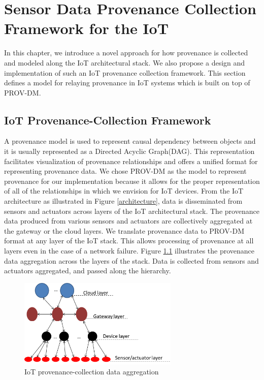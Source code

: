 
\chapter{Sensor Data Provenance Collection Framework for the IoT}

In this chapter, we introduce a novel approach for how provenance is collected and modeled along the IoT architectural stack. We also propose a design and  implementation of such an IoT provenance collection framework. This section defines a model for relaying provenance in IoT systems which is built on top of PROV-DM. 

\section{IoT Provenance-Collection Framework }
%

A provenance model is used to represent causal dependency between objects and it is usually represented as a Directed Acyclic Graph(DAG). This representation facilitates visualization of provenance relationships and offers a unified format for representing provenance data. We chose PROV-DM as the model to represent provenance for our implementation because it allows for the proper representation of all of the relationships in which we envision for IoT devices. 
From the IoT architecture as illustrated in Figure \ref{architecture}, data is disseminated from sensors and actuators across layers of the IoT architectural stack. The provenance data produced from various sensors and actuators are collectively aggregated at the gateway or the cloud layers. We translate provenance data to PROV-DM format at any layer of the IoT stack. This allows processing of provenance at all layers even in the case of a network failure. 
 Figure \ref{aggregation} illustrates the provenance data aggregation across the layers of the stack. Data is collected from sensors and actuators aggregated, and passed along the hierarchy. 


\begin{figure}[h!]
\begin{center}

\includegraphics[width=3.0in]{iot_aggregation.PNG}    
\end{center}
\caption{IoT provenance-collection data aggregation}
\label{aggregation}
\end{figure}


